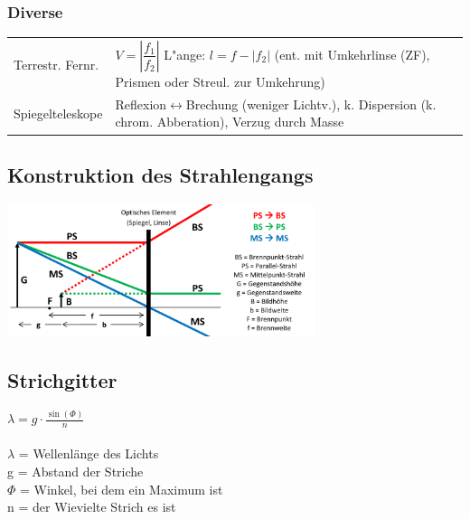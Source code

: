 \subsubsection{Diverse  }
\begin{tabular}{ll}
  Terrestr. Fernr. & 
  $V=\left|\dfrac{f_1}{f_2}\right|$ \qquad L"ange: $l=f-|f_2|$ (ent. mit
  Umkehrlinse (ZF), Prismen oder Streul. zur Umkehrung) \\
  Spiegelteleskope &
  Reflexion$\leftrightarrow$Brechung (weniger Lichtv.), k. Dispersion (k. chrom.
  Abberation), Verzug durch Masse  \\
\end{tabular}
\begin{multicols}{2}

\subsection{Konstruktion des Strahlengangs}
\begin{center}
  \includegraphics[width=9cm]{./bilder/strahlengang.png}
\end{center}

\subsection{Strichgitter}
$\lambda = g \cdot \frac{\sin(\Phi)}{n}$\\
\\
$\lambda$ = Wellenlänge des Lichts\\
g = Abstand der Striche\\
$\Phi$ = Winkel, bei dem ein Maximum ist\\
n = der Wievielte Strich es ist\\
\end{multicols}